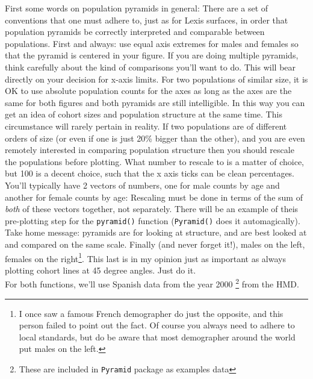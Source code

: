 \documentclass[a4paper]{article}
\begin{document}
First some words on population pyramids in general: There are a set of conventions that one must adhere to, just as for Lexis surfaces, in order that population pyramids be correctly interpreted and comparable between populations. First and always: use equal axis extremes for males and females so that the pyramid is centered in your figure. If you are doing multiple pyramids, think carefully about the kind of comparisons you'll want to do. This will bear directly on your decision for x-axis limits. For two populations of similar size, it is OK to use absolute population counts for the axes as long as the axes are the same for both figures and both pyramids are still intelligible. In this way you can get an idea of cohort sizes and population structure at the same time. This circumstance will rarely pertain in reality. If two populations are of different orders of size (or even if one is just 20\% bigger than the other), and you are even remotely interested in comparing population structure then you should rescale the populations before plotting. What number to rescale to is a matter of choice, but 100 is a decent choice, such that the x axis ticks can be clean percentages. You'll typically have 2 vectors of numbers, one for male counts by age and another for female counts by age: Rescaling must be done in terms of the sum of \textit{both} of these vectors together, not separately. There will be an example of theis pre-plotting step for the \texttt{pyramid()} function (\texttt{Pyramid()} does it automagically). Take home message: pyramids are for looking at structure, and are best looked at and compared on the same scale. Finally (and never forget it!), males on the left, females on the right\footnote{I once saw a famous French demographer do just the opposite, and this person failed to point out the fact. Of course you always need to adhere to local standards, but do be aware that most demographer around the world put males on the left.}. This last is in my opinion just as important as always plotting cohort lines at 45 degree angles. Just do it.\\

For both functions, we'll use Spanish data from the year 2000 \footnote{These are included in \texttt{Pyramid} package as examples data} from the HMD.
\end{document}
